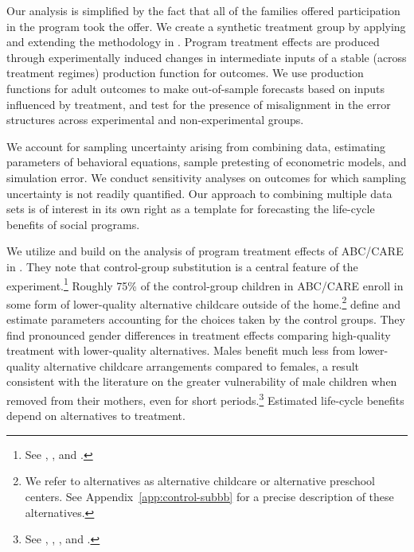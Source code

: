 Our analysis is simplified by the fact that all of the families offered participation in the program took the offer. We create a synthetic treatment group by applying and extending the methodology in \citet{Heckman_Pinto_etal_2013_PerryFactor}. Program treatment effects are produced through experimentally induced changes in intermediate inputs of a stable (across treatment regimes) production function for outcomes. We use production functions for adult outcomes to make out-of-sample forecasts based on inputs influenced by treatment, and test for the presence of misalignment in the error structures across experimental and non-experimental groups.

We account for sampling uncertainty arising from combining data, estimating parameters of behavioral equations, sample pretesting of econometric models, and simulation error. We conduct sensitivity analyses on outcomes for which sampling uncertainty is not readily quantified. Our approach to combining multiple data sets is of interest in its own right as a template for forecasting the life-cycle benefits of social programs.

We utilize and build on the analysis of program treatment effects of ABC/CARE in \cite{Garcia_Heckman_Ziff_2017_Gender-Diff_UNPUBLISHED}. They note that control-group substitution is a central feature of the experiment.\footnote{See \cite{Heckman_1992_randomization}, \cite{Heckman_Hohmann_etal_2000_QJE}, and \cite{Kline_Walters_2016_QJE}.} Roughly 75\% of the control-group children in ABC/CARE enroll in some form of lower-quality alternative childcare outside of the home.\footnote{We refer to alternatives as alternative childcare or alternative preschool centers. See  Appendix~\ref{app:control-subbb} for a precise description of these alternatives.} \citet{Garcia_Heckman_Ziff_2017_Gender-Diff_UNPUBLISHED} define and estimate parameters accounting for the choices taken by the control groups. They find pronounced gender differences in treatment effects comparing high-quality treatment with lower-quality alternatives. Males benefit much less from lower-quality alternative childcare arrangements compared to females, a result consistent with the literature on the greater vulnerability of male children when removed from their mothers, even for short periods.\footnote{See \citet{Kottelenberg_Lehrer_2014_Gender-Effects}, \citet{Baker_Gruber_Milligan_2015_Noncog_Defects}, \cite{Schore_2017_IMHJ}, and \cite{Garcia_Heckman_Ziff_2017_Gender-Diff_UNPUBLISHED}.} Estimated life-cycle benefits depend on alternatives to treatment.

